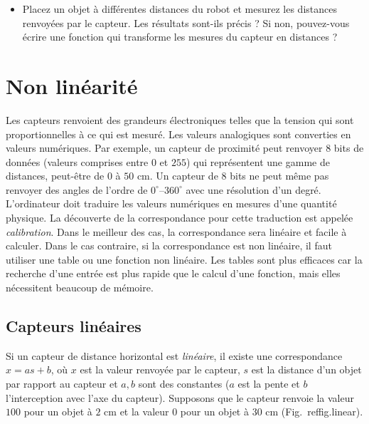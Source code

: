 \begin{framed}
\begin{itemize}
\item Placez un objet à différentes distances du robot et mesurez les distances renvoyées par le capteur. Les résultats sont-ils précis ? Si non, pouvez-vous écrire une fonction qui transforme les mesures du capteur en distances ?
\end{itemize}
\end{framed}

\section{Non linéarité}\label{s.nonlinearity}

Les capteurs renvoient des grandeurs électroniques telles que la tension qui sont proportionnelles à ce qui est mesuré. Les valeurs analogiques sont converties en valeurs numériques. Par exemple, un capteur de proximité peut renvoyer $8$ bits de données (valeurs comprises entre $0$ et $255$) qui représentent une gamme de distances, peut-être de $0$ à $50$ cm. Un capteur de $8$ bits ne peut même pas renvoyer des angles de l'ordre de $0^\circ$--$360^\circ$ avec une résolution d'un degré. L'ordinateur doit traduire les valeurs numériques en mesures d'une quantité physique. La découverte de la correspondance pour cette traduction est appelée \emph{calibration}. Dans le meilleur des cas, la correspondance sera linéaire et facile à calculer. Dans le cas contraire, si la correspondance est non linéaire, il faut utiliser une table ou une fonction non linéaire. Les tables sont plus efficaces car la recherche d'une entrée est plus rapide que le calcul d'une fonction, mais elles nécessitent beaucoup de mémoire.

\subsection{Capteurs linéaires}

Si un capteur de distance horizontal est \emph{linéaire}, il existe une correspondance $x = a s + b$, où $x$ est la valeur renvoyée par le capteur, $s$ est la distance d'un objet par rapport au capteur et $a,b$ sont des constantes ($a$ est la pente et $b$ l'interception avec l'axe du capteur). Supposons que le capteur renvoie la valeur $100$ pour un objet à $2$ cm et la valeur $0$ pour un objet à $30$ cm (Fig.~ref{fig.linear}).

